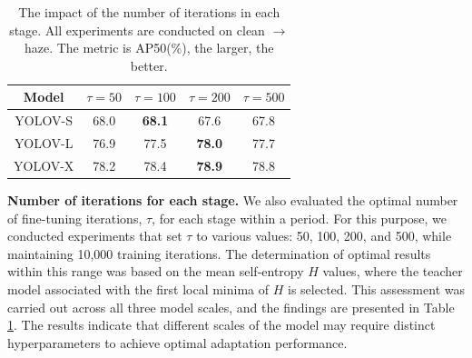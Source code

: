 \begin{table}
    \centering
    \begin{tabular}{c|c|c|c|c}
    \hline
        Model & $\tau = 50$ & $\tau = 100$ & $\tau = 200$  & $\tau = 500$ \\
        \hline
        YOLOV-S & 68.0 & \textbf{68.1} & 67.6 & 67.8 \\
        YOLOV-L & 76.9 & 77.5 & \textbf{78.0} & 77.7 \\
        YOLOV-X & 78.2 & 78.4 & \textbf{78.9} & 78.8 \\
    \hline
    \end{tabular}
    \caption{The impact of the number of iterations in each stage. All experiments are conducted on clean $\rightarrow$ haze. The metric is AP50(\%), the larger, the better.}
    \label{tab:iteration}
\end{table}

\noindent \textbf{Number of iterations for each stage.} We also evaluated the optimal number of fine-tuning iterations, $\tau$, for each stage within a period. For this purpose, we conducted experiments that set $\tau$ to various values: 50, 100, 200, and 500, while maintaining 10,000 training iterations. The determination of optimal results within this range was based on the mean self-entropy $H$ values, where the teacher model associated with the first local minima of $H$ is selected. This assessment was carried out across all three model scales, and the findings are presented in Table \ref{tab:iteration}. The results indicate that different scales of the model may require distinct hyperparameters to achieve optimal adaptation performance.